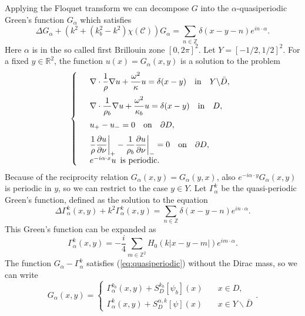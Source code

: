 \documentclass[a4paper]{article}
\theoremstyle{definition}
\newcommand{\Z}{\mathbb{Z}}
\newcommand{\R}{\mathbb{R}}
\newcommand{\C}{\mathcal{C}}
\newcommand{\ds}{\displaystyle}
\newcommand{\eqnref}[1]{(\ref {#1})}
\def\nm{\noalign{\medskip}}
\begin{document}
Applying the Floquet transform we can decompose $G$ into the $\alpha$-quasiperiodic Green's function $G_\alpha$ which satisfies
\begin{equation*}
\Delta G_\alpha + (k^2+(k_b^2-k^2)\chi(\C))G_\alpha = \sum_{n\in \Z} \delta(x-y-n)e^{in\cdot\alpha}.
\end{equation*}
Here $\alpha$ is in the so called first Brillouin zone $[0,2\pi]^2$. Let $Y= [-1/2,1/2]^2$. For a fixed $y\in \R^2$, the function $u(x)=G_\alpha(x,y)$ is a solution to the problem
\begin{equation} \label{eq:quasiperiodic}
\left\{
\begin{array} {ll}
&\ds \nabla \cdot \frac{1}{\rho} \nabla  u+ \frac{\omega^2}{\kappa} u  = \delta(x-y) \quad \text{in} \quad Y \backslash  \bar{D}, \\
\nm
&\ds \nabla \cdot \frac{1}{\rho_b} \nabla  u+ \frac{\omega^2}{\kappa_b} u  = \delta(x-y) \quad \text{in} \quad D, \\
\nm
&\ds  u_{+} -u_{-}  =0   \quad \text{on} \quad \partial D, \\
\nm
& \ds  \frac{1}{\rho} \frac{\partial u}{\partial \nu} \bigg|_{+} - \frac{1}{\rho_b} \frac{\partial u}{\partial \nu} \bigg|_{-} =0 \quad \text{on} \quad \partial D, \\
&  e^{-i \alpha \cdot x} u  \,\,\,  \text{is periodic.}
\end{array}
\right.
\end{equation}
Because of the reciprocity relation $G_\alpha(x,y) = G_\alpha(y,x)$, also $e^{-i \alpha \cdot y} G_\alpha(x,y)$ is periodic in $y$, so we can restrict to the case $y\in Y$. Let $\Gamma_\alpha^k$ be the quasi-periodic Green's function, defined as the solution to the equation
\begin{equation*}
\Delta \Gamma_\alpha^k(x,y) + k^2\Gamma_\alpha^k(x,y) = \sum_{n\in \Z} \delta(x-y-n)e^{in\cdot\alpha}.
\end{equation*}
This Green's function can be expanded as
\begin{equation} \label{eq:quasihomogenious}
\Gamma_\alpha^k(x,y) = -\frac{i}{4}\sum_{m\in \Z^2} H_0(k|x-y-m|)e^{im\cdot\alpha}.
\end{equation}
The function $G_\alpha-\Gamma_\alpha^k$ satisfies \eqnref{eq:quasiperiodic} without the Dirac mass, so we can write
\begin{equation} \label{eq:G_a}
G_\alpha(x,y) = \begin{cases} \Gamma_\alpha^{k_b}(x,y) + S_D^{k_b}[\psi_b](x) \quad &x\in D, \\  \Gamma_\alpha^{k}(x,y) + S_D^{\alpha,k}[\psi](x) &x\in Y \backslash \bar{D} \end{cases}.
\end{equation}
\end{document}
